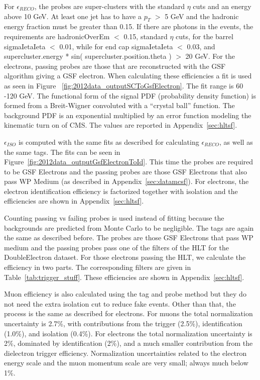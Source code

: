 For $\epsilon_{RECO}$, the probes are super-clusters with the standard $\eta$ cuts and an energy above 10 GeV. At least one jet has to have a $p_T$ $>$ 5 GeV and the hadronic energy fraction must be greater than 0.15. If there are photons in the events, the requirements are hadronicOverEm $<$ 0.15, standard $\eta$ cuts, for the barrel sigmaIetaIeta $<$ 0.01, while for end cap sigmaIetaIeta $<$ 0.03, and supercluster.energy * sin( supercluster.position.theta ) $>$ 20 GeV. For the electrons, passing probes are those that are reconstructed with the GSF algorithm giving a GSF electron.  When calculating these efficiencies a fit is used as seen in Figure ~\ref{fig:2012data_outputSCToGsfElectron}.  The fit range is 60 -120 GeV. The functional form of the signal PDF (probability density function) is formed from a Breit-Wigner convoluted with a ``crystal ball'' function. The background PDF is an exponential multiplied by an error function modeling the kinematic turn on of CMS. The values are reported in Appendix~\ref{sec:hltsf}.


$\epsilon_{ISO}$ is computed with the same fits as described for calculating $\epsilon_{RECO}$, as well as the same tags. The fits can be seen in Figure~\ref{fig:2012data_outputGsfElectronToId}. This time the probes are required to be GSF Electrons and the passing probes are those GSF Electrons that also pass WP Medium (as described in Appendix~\ref{sec:datamcsf}). For electrons, the electron identification efficiency is factorized together with isolation and the efficiencies are shown in Appendix~\ref{sec:hltsf}.


Counting passing vs failing probes is used instead of fitting because the backgrounds are predicted from Monte Carlo to be negligible. The tags are again the same as described before. The probes are those GSF Electrons that pass WP medium and the passing probes pass one of the filters of the HLT for the DoubleElectron dataset. For those electrons passing the HLT, we calculate the efficiency in two parts.  The corresponding filters are given in Table~\ref{tab:trigger_stuff}. These efficiencies are shown in Appendix~\ref{sec:hltsf}.

Muon efficiency is also calculated using the tag and probe method but they do not need the extra isolation cut to reduce fake events.  Other than that, the process is the same as described for electrons.  For muons the total normalization uncertainty is 2.7\%, with contributions from the trigger (2.5\%), identification (1.0\%), and isolation (0.4\%). For electrons the total normalization uncertainty is 2\%, dominated by identification (2\%), and a much smaller contribution from the dielectron trigger efficiency. Normalization uncertainties related to the electron energy scale and the muon momentum scale are very small; always much below 1\%.


